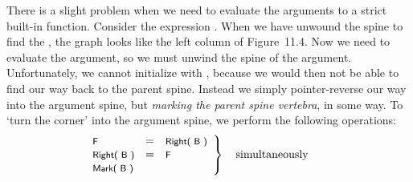There is a slight problem when we need to evaluate the arguments to a strict
built-in function. Consider the expression . When we have
unwound the spine to find the , the graph looks like the left column of Figure~11.4.
Now we need to evaluate the argument, so we must unwind the spine of
the argument. Unfortunately, we cannot initialize  with , because we
would then not be able to find our way back to the parent spine. Instead we
simply pointer-reverse our way into the argument spine, but \textit{marking the
    parent spine vertebra}, in some way. To `turn the corner’ into the argument
spine, we perform the following operations:
\[\hspace{-.75cm}
\left.
\begin{array}{lcl}
    \text{\ml{F}}       & = & \text{\ml{Right( B )}} \\
    \text{\ml{Right( B )}} & = & \text{\ml{F}}       \\
    \text{\ml{Mark( B )}}
\end{array}
\right\}
\quad \text{simultaneously}
\]


